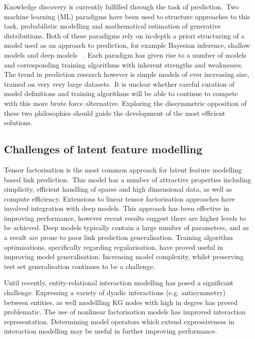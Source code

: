 \noindent Knowledge discovery is currently fulfilled through the task of prediction.\ Two machine learning (ML) paradigms have been used to structure approaches to this task, probabilistic modelling and mathematical estimation of generative distributions. Both of these paradigms rely on in-depth a priori structuring of a model used as an approach to prediction, for example Bayesian inference, shallow models and deep models \unskip~\citep{murphy2012machine}. Each paradigm has given rise to a number of models and corresponding training algorithms with inherent strengths and weaknesses. The trend in prediction research however is simple models of ever increasing size, trained on very very large datasets.\ It is unclear whether careful curation of model definitions and training algorithms will be able to continue to compete with this more brute force alternative. Exploring the dissymmetric opposition of these two philosophies should guide the development of the most efficient solutions.

\subsection{Challenges of latent feature modelling} 

Tensor factorisation is the most common approach for latent feature modelling based link prediction.\ This model has a number of attractive properties including simplicity, efficient handling of sparse and high dimensional data, as well as compute efficiency. Extensions to linear tensor factorisation approaches have involved integration with deep models. This approach has been effective in improving performance, however recent results suggest there are higher levels to be achieved. Deep models typically contain a large number of parameters, and as a result are prone to poor link prediction generalisation. Training algorithm optimisations, specifically regarding regularisation, have proved useful in improving model generalisation. Increasing model complexity, whilst preserving test set generalisation continues to be a challenge. \par

\noindent Until recently, entity-relational interaction modelling has posed a significant challenge. Expressing a variety of dyadic interactions (e.g. antisymmetry) between entities, as well modellling KG nodes with high in degree has proved problematic. The use of nonlinear factorisation models has improved interaction representation. Determining model operators which extend expressiveness in interaction modelling may be useful in further improving performance.\par

